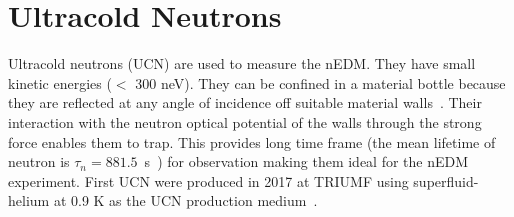 



\section{Ultracold Neutrons}
Ultracold neutrons (UCN) are used to measure the nEDM. They have small kinetic energies ($<$ 300 neV).  They can be confined in a material bottle because they are reflected at any angle of incidence off suitable material walls~\cite{ucn_storage}. Their interaction with the neutron optical potential of the walls through the strong force enables them to trap. This provides long time frame (the mean lifetime of neutron is $\tau_n=881.5$~s~\cite{mike}) for observation making them ideal for the nEDM experiment. First UCN were produced in 2017 at TRIUMF using superfluid-helium at 0.9 K as the UCN production medium~\cite{TRIUMF_UCN,taraneh_theis,TRIUMF_Beamline}.


